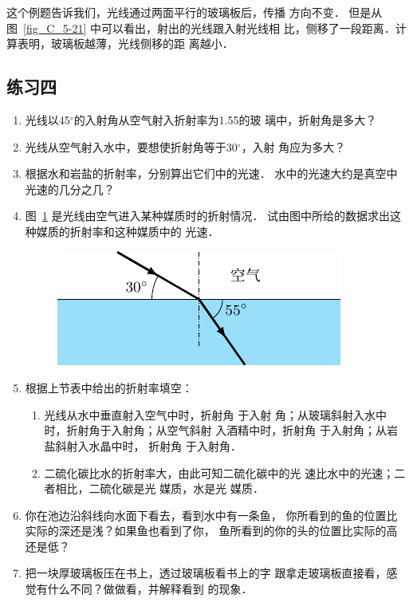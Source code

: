 这个例题告诉我们，光线通过两面平行的玻璃板后，传播
方向不变．
但是从图~\ref{fig_C_5-21} 中可以看出，射出的光线跟入射光线相
比，侧移了一段距离．计算表明，玻璃板越薄，光线侧移的距
离越小．

\subsection*{练习四}
\begin{enumerate}
    \item 光线以45$^\circ$的入射角从空气射入折射率为1.55的玻
璃中，折射角是多大？
\item 光线从空气射入水中，要想使折射角等于30$^\circ$，入射
角应为多大？
\item 根据水和岩盐的折射率，分别算出它们中的光速．
水中的光速大约是真空中光速的几分之几？
\item 图~\ref{fig_C_5-22} 是光线由空气进入某种媒质时的折射情况．
试由图中所给的数据求出这种媒质的折射率和这种媒质中的
光速．
\begin{figure}[htbp]
    \centering
    \includegraphics{fig/C/5-22.pdf}
    \caption{}\label{fig_C_5-22}
\end{figure}

    \item 根据上节表中给出的折射率填空：
    \begin{enumerate}
        \item 光线从水中垂直射入空气中时，折射角\underline{\qquad}
    于入射
    角；从玻璃斜射入水中时，折射角\underline{\qquad}于入射角；从空气斜射
    入酒精中时，折射角\underline{\qquad}
    于入射角；从岩盐斜射入水晶中时，
    折射角\underline{\qquad}
    于入射角．
    \item 二硫化碳比水的折射率大，由此可知二硫化碳中的光
    速比水中的光速\underline{\qquad}；二者相比，二硫化碳是光\underline{\qquad}
    媒质，水是光\underline{\qquad}
    媒质．
    \end{enumerate}
    
    \item 你在池边沿斜线向水面下看去，看到水中有一条鱼，
    你所看到的鱼的位置比实际的深还是浅？如果鱼也看到了你，
    鱼所看到的你的头的位置比实际的高还是低？
    \item 把一块厚玻璃板压在书上，透过玻璃板看书上的字
    跟拿走玻璃板直接看，感觉有什么不同？做做看，并解释看到
    的现象．
\end{enumerate}


